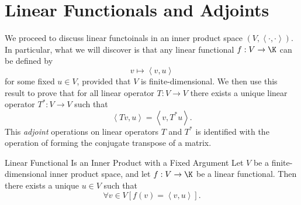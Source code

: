 \documentclass[linearalgebraII]{subfiles}
\begin{document}
    \section{Linear Functionals and Adjoints}
    
    \begin{remark}
        We proceed to discuss linear functoinals in an inner product space $\left( V,\left\langle \cdot, \cdot\right\rangle  \right)$. In particular, what we will discover is that any linear functional $f:V\to\K$ can be defined by 
        \begin{equation*}
            v\mapsto \left\langle v, u\right\rangle 
        \end{equation*}
        for some fixed $u\in V$, provided that $V$ is finite-dimensional. We then use this result to prove that for all linear operator $T:V\to V$ there exists a unique linear operator $T^*:V\to V$ such that
        \begin{equation*}
            \left\langle Tv, u\right\rangle = \left\langle v, T^*u\right\rangle .
        \end{equation*}
        This \textit{adjoint} operations on linear operators $T$ and $T^*$ is identified with the operation of forming the conjugate transpose of a matrix.
    \end{remark}

    \clearpage
    \begin{theorem}{Linear Functional Is an Inner Product with a Fixed Argument}
        Let $V$ be a finite-dimensional inner product space, and let $f:V\to\K$ be a linear functional. Then there exists a unique $u\in V$ such that
        \begin{equation*}
            \forall v\in V\left[ f(v)= \left\langle v, u\right\rangle  \right] .
        \end{equation*}
    \end{theorem}
\end{document}
